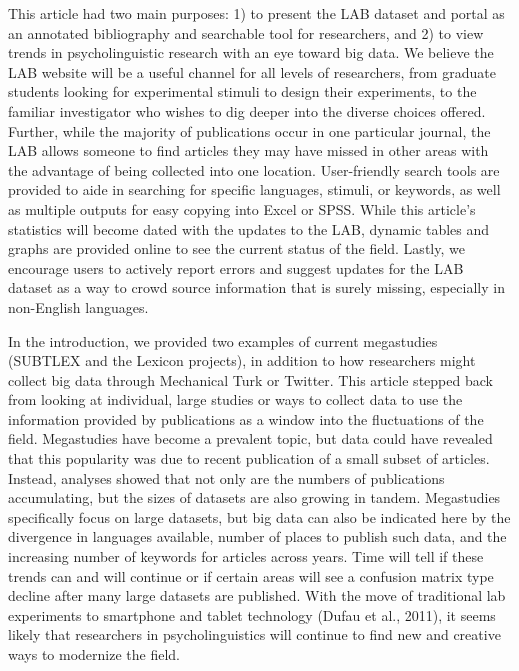 \documentclass[english,man]{apa6}
\theoremstyle{definition}
\theoremstyle{definition}
\theoremstyle{definition}
\theoremstyle{remark}
\begin{document}
This article had two main purposes: 1) to present the LAB dataset and
portal as an annotated bibliography and searchable tool for researchers,
and 2) to view trends in psycholinguistic research with an eye toward
big data. We believe the LAB website will be a useful channel for all
levels of researchers, from graduate students looking for experimental
stimuli to design their experiments, to the familiar investigator who
wishes to dig deeper into the diverse choices offered. Further, while
the majority of publications occur in one particular journal, the LAB
allows someone to find articles they may have missed in other areas with
the advantage of being collected into one location. User-friendly search
tools are provided to aide in searching for specific languages, stimuli,
or keywords, as well as multiple outputs for easy copying into Excel or
SPSS. While this article's statistics will become dated with the updates
to the LAB, dynamic tables and graphs are provided online to see the
current status of the field. Lastly, we encourage users to actively
report errors and suggest updates for the LAB dataset as a way to crowd
source information that is surely missing, especially in non-English
languages.

In the introduction, we provided two examples of current megastudies
(SUBTLEX and the Lexicon projects), in addition to how researchers might
collect big data through Mechanical Turk or Twitter. This article
stepped back from looking at individual, large studies or ways to
collect data to use the information provided by publications as a window
into the fluctuations of the field. Megastudies have become a prevalent
topic, but data could have revealed that this popularity was due to
recent publication of a small subset of articles. Instead, analyses
showed that not only are the numbers of publications accumulating, but
the sizes of datasets are also growing in tandem. Megastudies
specifically focus on large datasets, but big data can also be indicated
here by the divergence in languages available, number of places to
publish such data, and the increasing number of keywords for articles
across years. Time will tell if these trends can and will continue or if
certain areas will see a confusion matrix type decline after many large
datasets are published. With the move of traditional lab experiments to
smartphone and tablet technology (Dufau et al., 2011), it seems likely
that researchers in psycholinguistics will continue to find new and
creative ways to modernize the field.

\newpage
\end{document}
